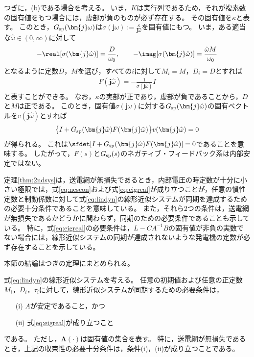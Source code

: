 \documentclass[tombow,dvipdfmx]{corona-a5}
\begin{document}
\begin{証明}
つぎに，(b)である場合を考える。
いま，$K$は実行列であるため，それが複素数の固有値をもつ場合には，虚部が負のものが必ず存在する。
その固有値を$\kappa$と表す。
このとき，$G_{\rm sp}(\bm{j} \omega)$は$\sigma (\bm{j} \omega):= \frac{\kappa}{\bm{j} \omega}$を固有値にもつ。
いま，ある適当な$\hat{\omega}\in (0,\infty)$に対して
\begin{align}\label{eq:Fspara}
-\real[\sigma(\bm{j} \hat{\omega})]  = \frac{D}{\omega_0}
,\qquad
-\imag[\sigma(\bm{j} \hat{\omega})]  = \frac{\hat{\omega} M}{\omega_0}
\end{align}
となるように定数$D$，$M$を選び，すべての$i$に対して$M_i=M$，$D_i=D$とすれば
\begin{align*}
F(\bm{j} \hat{\omega}) = - \frac{1}{ \sigma(\bm{j} \hat{\omega}) } I
\end{align*}
と表すことができる。
なお，$\kappa$の実部が正であり，虚部が負であることから，$D$と$M$は正である。
このとき，固有値$\sigma (\bm{j} \omega)$に対する$G_{\rm sp}(\bm{j} \hat{\omega})$の固有ベクトルを$v(\bm{j} \hat{\omega})$とすれば
\begin{align*}
\bigl\{ I+G_{\rm sp}(\bm{j} \hat{\omega})F(\bm{j} \hat{\omega})\bigr\}
v(\bm{j} \hat{\omega})
=0
\end{align*}
が得られる。
これは$\sfdet [I+G_{\rm sp}(\bm{j} \hat{\omega}) F(\bm{j} \hat{\omega})]=0$であることを意味する。
したがって，$F(s)$と$G_{\rm sp}(s)$のネガティブ・フィードバック系は内部安定ではない。
\end{証明}


定理\ref{thm:2ndsys}は，送電網が無損失であるとき，内部電圧の時定数が十分に小さい極限では，式\ref{eq:nescon}および式\ref{eq:eigreal}が成り立つことが，任意の慣性定数と制動係数に対して式\ref{eq:lindyn}の線形近似システムが同期を達成するための必要十分条件であることを意味している。
また，それら2つの条件は，送電網が無損失であるかどうかに関わらず，同期のための必要条件であることも示している。
特に，式\ref{eq:eigreal}の必要条件は，$L-CA^{-1}B$の固有値が非負の実数でない場合には，線形近似システムの同期が達成されないような発電機の定数が必ず存在することを示している。




本節の結論はつぎの定理にまとめられる。


\begin{定理}[線形近似システムの同期条件]\label{thm:sync}
式\ref{eq:lindyn}の線形近似システムを考える。
任意の初期値および任意の正定数$M_i$，$D_i$，$\tau_i$に対して，線形近似システムが同期するための必要条件は，
\begin{itemize}
\item[(i)] $A$が安定であること，かつ
\item[(ii)] 式\ref{eq:eigreal}が成り立つこと
\end{itemize}
である。
ただし，$\bm{\Lambda}(\cdot)$は固有値の集合を表す。
特に，送電網が無損失であるとき，上記の収束性の必要十分条件は，条件(i)，(ii)が成り立つことである。
\end{定理}
\end{document}
